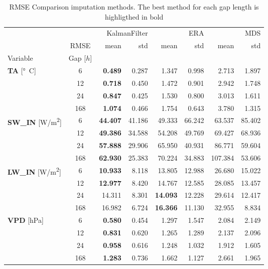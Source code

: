 \begin{table}
\centering
\caption{RMSE Comparison imputation methods. The best method for each gap length is highligthed in bold}
\label{the_table}
\begin{tabular}{p{2.1cm}c|rr|rr|rr}
\toprule
 &  & \multicolumn{2}{r}{KalmanFilter} & \multicolumn{2}{r}{ERA} & \multicolumn{2}{r}{MDS} \\
 & RMSE & mean & std & mean & std & mean & std \\
Variable & Gap [$h$] &  &  &  &  &  &  \\
\midrule
\multirow[c]{4}{*}{\parbox{2.1cm}{\textbf{TA} [\si{°C}]}} & 6 & \bfseries 0.489 & 0.287 & 1.347 & 0.998 & 2.713 & 1.897 \\
 & 12 & \bfseries 0.718 & 0.450 & 1.472 & 0.901 & 2.942 & 1.748 \\
 & 24 & \bfseries 0.847 & 0.425 & 1.530 & 0.800 & 3.013 & 1.611 \\
 & 168 & \bfseries 1.074 & 0.466 & 1.754 & 0.643 & 3.780 & 1.315 \\
\cline{1-8}
\multirow[c]{4}{*}{\parbox{2.1cm}{\textbf{SW\_IN} [\si{W/m^2}]}} & 6 & \bfseries 44.407 & 41.186 & 49.333 & 66.242 & 63.537 & 85.402 \\
 & 12 & \bfseries 49.386 & 34.588 & 54.208 & 49.769 & 69.427 & 68.936 \\
 & 24 & \bfseries 57.888 & 29.906 & 65.950 & 40.931 & 86.771 & 59.604 \\
 & 168 & \bfseries 62.930 & 25.383 & 70.224 & 34.883 & 107.384 & 53.606 \\
\cline{1-8}
\multirow[c]{4}{*}{\parbox{2.1cm}{\textbf{LW\_IN} [\si{W/m^2}]}} & 6 & \bfseries 10.933 & 8.118 & 13.805 & 12.988 & 26.680 & 15.022 \\
 & 12 & \bfseries 12.977 & 8.420 & 14.767 & 12.585 & 28.085 & 13.457 \\
 & 24 & 14.311 & 8.301 & \bfseries 14.093 & 12.228 & 29.614 & 12.417 \\
 & 168 & 16.982 & 6.724 & \bfseries 16.366 & 11.130 & 32.955 & 8.834 \\
\cline{1-8}
\multirow[c]{4}{*}{\parbox{2.1cm}{\textbf{VPD} [\si{hPa}]}} & 6 & \bfseries 0.580 & 0.454 & 1.297 & 1.547 & 2.084 & 2.149 \\
 & 12 & \bfseries 0.831 & 0.620 & 1.265 & 1.289 & 2.137 & 2.096 \\
 & 24 & \bfseries 0.958 & 0.616 & 1.248 & 1.032 & 1.912 & 1.605 \\
 & 168 & \bfseries 1.283 & 0.736 & 1.662 & 1.127 & 2.661 & 1.965 \\

\end{tabular}
\end{table}
